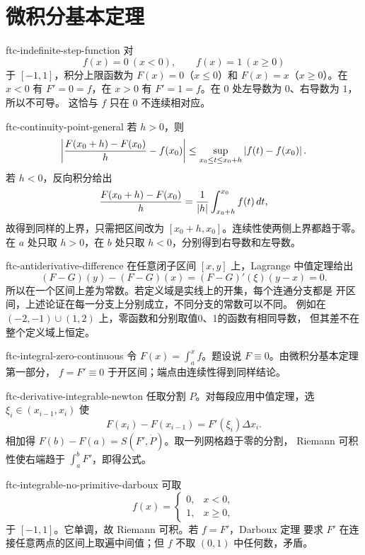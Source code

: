 \chapter{微积分基本定理}
\label{chap:fundamental-theorem-calculus-solutions}

\begin{solution}{ftc-indefinite-step-function}
对
\[
 f(x)=0\ (x<0),\qquad f(x)=1\ (x\ge0)
\]
于 \([-1,1]\)，积分上限函数为 \(F(x)=0\)（\(x\le0\)）和
\(F(x)=x\)（\(x\ge0\)）。在 \(x<0\) 有 \(F'=0=f\)，在 \(x>0\)
有 \(F'=1=f\)。在 \(0\) 处左导数为 \(0\)、右导数为 \(1\)，所以不可导。
这恰与 \(f\) 只在 \(0\) 不连续相对应。
\end{solution}

\begin{solution}{ftc-continuity-point-general}
若 \(h>0\)，则
\[
 \left|\frac{F(x_0+h)-F(x_0)}h-f(x_0)\right|
 \le\sup_{x_0\le t\le x_0+h}\left|f(t)-f(x_0)\right|.
\]
若 \(h<0\)，反向积分给出
\[
 \frac{F(x_0+h)-F(x_0)}h
 =\frac1{\left|h\right|}\int_{x_0+h}^{x_0}f(t)\,dt,
\]
故得到同样的上界，只需把区间改为
\([x_0+h,x_0]\)。连续性使两侧上界都趋于零。在 \(a\) 处只取
\(h>0\)，在 \(b\) 处只取 \(h<0\)，分别得到右导数和左导数。
\end{solution}

\begin{solution}{ftc-antiderivative-difference}
在任意闭子区间 \([x,y]\) 上，Lagrange 中值定理给出
\[
 (F-G)(y)-(F-G)(x)=(F-G)'(\xi)(y-x)=0.
\]
所以在一个区间上差为常数。若定义域是实线上的开集，每个连通分支都是
开区间，上述论证在每一分支上分别成立，不同分支的常数可以不同。
例如在 \((-2,-1)\cup(1,2)\) 上，零函数和分别取值0、1的函数有相同导数，
但其差不在整个定义域上恒定。
\end{solution}

\begin{solution}{ftc-integral-zero-continuous}
令 \(F(x)=\int_a^x f\)。题设说 \(F\equiv0\)。由微积分基本定理第一部分，
\(f=F'\equiv0\) 于开区间；端点由连续性得到同样结论。
\end{solution}

\begin{solution}{ftc-derivative-integrable-newton}
任取分割 \(P\)。对每段应用中值定理，选
\(\xi_i\in(x_{i-1},x_i)\) 使
\[
 F(x_i)-F(x_{i-1})=F'(\xi_i)\Delta x_i.
\]
相加得 \(F(b)-F(a)=S(F',\dot P)\)。取一列网格趋于零的分割，
Riemann 可积性使右端趋于 \(\int_a^bF'\)，即得公式。
\end{solution}

\begin{solution}{ftc-integrable-no-primitive-darboux}
可取
\[
 f(x)=\begin{cases}0,&x<0,\\1,&x\ge0,\end{cases}
\]
于 \([-1,1]\)。它单调，故 Riemann 可积。若 \(f=F'\)，Darboux 定理
要求 \(F'\) 在连接任意两点的区间上取遍中间值；但 \(f\) 不取
\((0,1)\) 中任何数，矛盾。
\end{solution}

